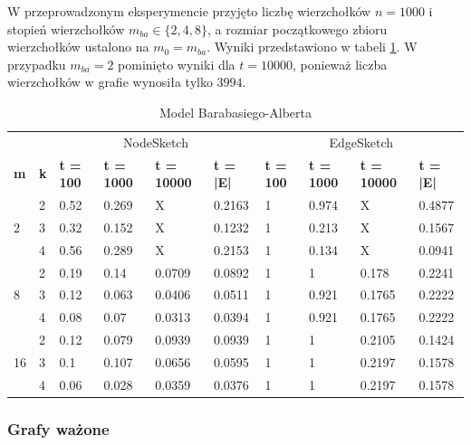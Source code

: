     W przeprowadzonym eksperymencie przyjęto liczbę wierzchołków $n = 1000$ i stopień wierzchołków $m_{ba} \in \{2,4,8\}$, a rozmiar początkowego zbioru wierzchołków ustalono na $m_0 = m_{ba}$. Wyniki przedstawiono w tabeli \ref{tab:barabasi_albert}. W przypadku $m_{ba} = 2$ pominięto wyniki dla $t = 10000$, ponieważ liczba wierzchołków w grafie wynosiła tylko $3994$.
    \begin{table}[!ht]
        \small
        \centering
        \begin{tabular}{|l|l|l|l|l|l|l|l|l|l|}
        \hline
            & & \multicolumn{4}{c|}{NodeSketch} & \multicolumn{4}{c|}{EdgeSketch} \\ \cline{1-10}
            \textbf{m} & \textbf{k} & \textbf{t = 100} & \textbf{t = 1000} & \textbf{t = 10000} & \textbf{t = |E|} & \textbf{t = 100} & \textbf{t = 1000} & \textbf{t = 10000} & \textbf{t = |E|} \\ \hline\hline
            \multirow{3}{*}{2} & 2 & 0.52 & 0.269 & X & 0.2163 & 1 & 0.974 & X & 0.4877 \\ \cline{2-10}
            & 3 & 0.32 & 0.152 & X & 0.1232 & 1 & 0.213 & X & 0.1567 \\ \cline{2-10}
            & 4 & 0.56 & 0.289 & X & 0.2153 & 1 & 0.134 & X & 0.0941 \\ \hline\hline
            \multirow{3}{*}{8} & 2 & 0.19 & 0.14 & 0.0709 & 0.0892 & 1 & 1 & 0.178 & 0.2241 \\ \cline{2-10}
            & 3 & 0.12 & 0.063 & 0.0406 & 0.0511 & 1 & 0.921 & 0.1765 & 0.2222 \\ \cline{2-10}
            & 4 & 0.08 & 0.07 & 0.0313 & 0.0394 & 1 & 0.921 & 0.1765 & 0.2222 \\ \hline\hline
            \multirow{3}{*}{16} & 2 & 0.12 & 0.079 & 0.0939 & 0.0939 & 1 & 1 & 0.2105 & 0.1424 \\ \cline{2-10}
            & 3 & 0.1 & 0.107 & 0.0656 & 0.0595 & 1 & 1 & 0.2197 & 0.1578 \\ \cline{2-10}
            & 4 & 0.06 & 0.028 & 0.0359 & 0.0376 & 1 & 1 & 0.2197 & 0.1578 \\ \hline
        \end{tabular}
        \caption{Model Barabasiego-Alberta}
        \label{tab:barabasi_albert}
    \end{table}

    \subsubsection{Grafy ważone}

